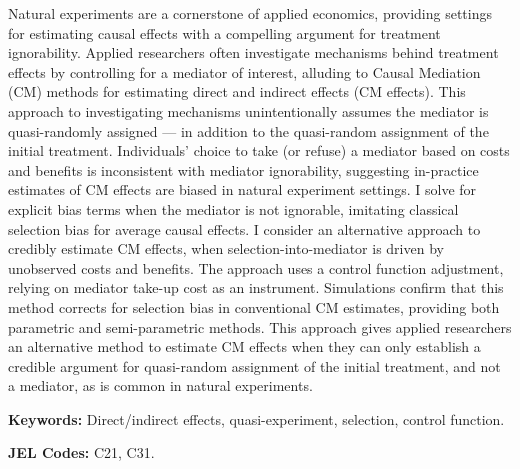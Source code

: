 \noindent
Natural experiments are a cornerstone of applied economics, providing settings for estimating causal effects with a compelling argument for treatment ignorability.
Applied researchers often investigate mechanisms behind treatment effects by controlling for a mediator of interest, alluding to Causal Mediation (CM) methods for estimating direct and indirect effects (CM effects).
This approach to investigating mechanisms unintentionally assumes the mediator is quasi-randomly assigned --- in addition to the quasi-random assignment of the initial treatment.
Individuals' choice to take (or refuse) a mediator based on costs and benefits is inconsistent with mediator ignorability, suggesting in-practice estimates of CM effects are biased in natural experiment settings.
I solve for explicit bias terms when the mediator is not ignorable, imitating classical selection bias for average causal effects.
I consider an alternative approach to credibly estimate CM effects, when selection-into-mediator is driven by unobserved costs and benefits.
The approach uses a control function adjustment, relying on mediator take-up cost as an instrument.
Simulations confirm that this method corrects for selection bias in conventional CM estimates, providing both parametric and semi-parametric methods.
This approach gives applied researchers an alternative method to estimate CM effects when they can only establish a credible argument for quasi-random assignment of the initial treatment, and not a mediator, as is common in natural experiments.

\vspace{0.5cm}
\noindent
\textbf{Keywords:}
Direct/indirect effects, quasi-experiment, selection, control function.

\vspace{0.1cm}
\noindent
\textbf{JEL Codes:}
C21, C31.
